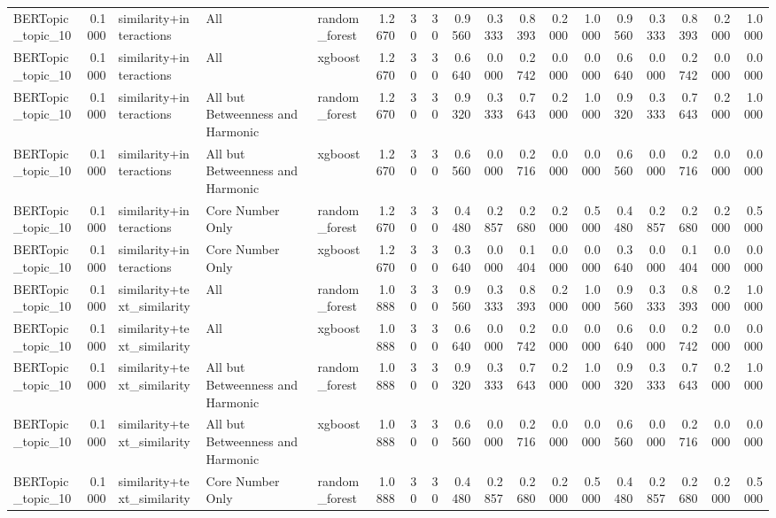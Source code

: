 \begin{tabular}{lrlllrrrrrrrrrrrrr}
BERTopic_topic_10 & 0.1000 & similarity+interactions & All & random_forest & 1.2670 & 30 & 30 & 0.9560 & 0.3333 & 0.8393 & 0.2000 & 1.0000 & 0.9560 & 0.3333 & 0.8393 & 0.2000 & 1.0000 \\
BERTopic_topic_10 & 0.1000 & similarity+interactions & All & xgboost & 1.2670 & 30 & 30 & 0.6640 & 0.0000 & 0.2742 & 0.0000 & 0.0000 & 0.6640 & 0.0000 & 0.2742 & 0.0000 & 0.0000 \\
BERTopic_topic_10 & 0.1000 & similarity+interactions & All but Betweenness and Harmonic & random_forest & 1.2670 & 30 & 30 & 0.9320 & 0.3333 & 0.7643 & 0.2000 & 1.0000 & 0.9320 & 0.3333 & 0.7643 & 0.2000 & 1.0000 \\
BERTopic_topic_10 & 0.1000 & similarity+interactions & All but Betweenness and Harmonic & xgboost & 1.2670 & 30 & 30 & 0.6560 & 0.0000 & 0.2716 & 0.0000 & 0.0000 & 0.6560 & 0.0000 & 0.2716 & 0.0000 & 0.0000 \\
BERTopic_topic_10 & 0.1000 & similarity+interactions & Core Number Only & random_forest & 1.2670 & 30 & 30 & 0.4480 & 0.2857 & 0.2680 & 0.2000 & 0.5000 & 0.4480 & 0.2857 & 0.2680 & 0.2000 & 0.5000 \\
BERTopic_topic_10 & 0.1000 & similarity+interactions & Core Number Only & xgboost & 1.2670 & 30 & 30 & 0.3640 & 0.0000 & 0.1404 & 0.0000 & 0.0000 & 0.3640 & 0.0000 & 0.1404 & 0.0000 & 0.0000 \\
BERTopic_topic_10 & 0.1000 & similarity+text_similarity & All & random_forest & 1.0888 & 30 & 30 & 0.9560 & 0.3333 & 0.8393 & 0.2000 & 1.0000 & 0.9560 & 0.3333 & 0.8393 & 0.2000 & 1.0000 \\
BERTopic_topic_10 & 0.1000 & similarity+text_similarity & All & xgboost & 1.0888 & 30 & 30 & 0.6640 & 0.0000 & 0.2742 & 0.0000 & 0.0000 & 0.6640 & 0.0000 & 0.2742 & 0.0000 & 0.0000 \\
BERTopic_topic_10 & 0.1000 & similarity+text_similarity & All but Betweenness and Harmonic & random_forest & 1.0888 & 30 & 30 & 0.9320 & 0.3333 & 0.7643 & 0.2000 & 1.0000 & 0.9320 & 0.3333 & 0.7643 & 0.2000 & 1.0000 \\
BERTopic_topic_10 & 0.1000 & similarity+text_similarity & All but Betweenness and Harmonic & xgboost & 1.0888 & 30 & 30 & 0.6560 & 0.0000 & 0.2716 & 0.0000 & 0.0000 & 0.6560 & 0.0000 & 0.2716 & 0.0000 & 0.0000 \\
BERTopic_topic_10 & 0.1000 & similarity+text_similarity & Core Number Only & random_forest & 1.0888 & 30 & 30 & 0.4480 & 0.2857 & 0.2680 & 0.2000 & 0.5000 & 0.4480 & 0.2857 & 0.2680 & 0.2000 & 0.5000 \\

\end{tabular}
